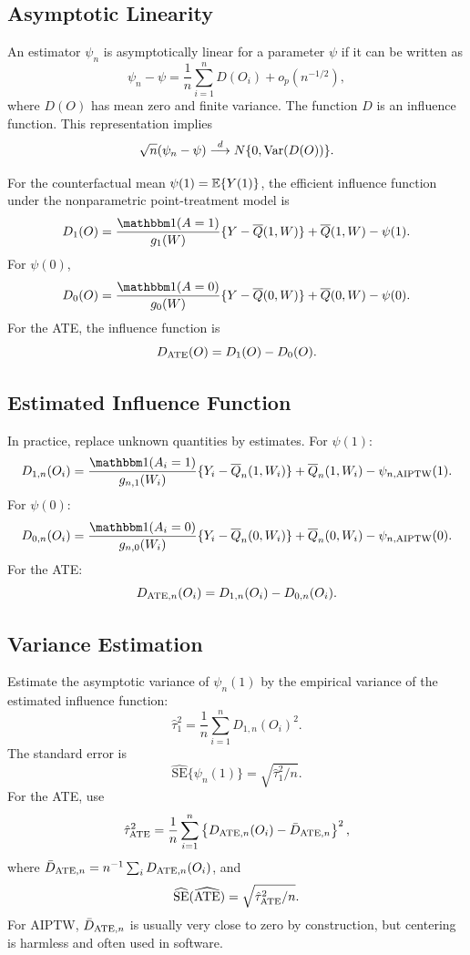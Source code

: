 \label{lec:7-5}

\subsection{Asymptotic Linearity}

An estimator $\psi_n$ is asymptotically linear for a parameter $\psi$ if it can be
written as
\[
\psi_n-\psi
=
\frac{1}{n}\sum_{i=1}^n D(O_i)+o_p(n^{-1/2}),
\]
where $D(O)$ has mean zero and finite variance. The function $D$ is an influence
function. This representation implies
\[
\sqrt n(\psi_n-\psi)\overset{d}{\longrightarrow}
N\{0,\operatorname{Var}(D(O))\}.
\]

For the counterfactual mean $\psi(1)=\mathbb{E}\{Y(1)\}$, the efficient influence function
under the nonparametric point-treatment model is
\[
D_1(O)
=
\frac{\ind(A=1)}{g_1(W)}
\{Y-\Qbar(1,W)\}
+
\Qbar(1,W)-\psi(1).
\]
For $\psi(0)$,
\[
D_0(O)
=
\frac{\ind(A=0)}{g_0(W)}
\{Y-\Qbar(0,W)\}
+
\Qbar(0,W)-\psi(0).
\]
For the ATE, the influence function is
\[
D_{\operatorname{ATE}}(O)=D_1(O)-D_0(O).
\]

\subsection{Estimated Influence Function}

In practice, replace unknown quantities by estimates. For $\psi(1)$:
\[
D_{1,n}(O_i)
=
\frac{\ind(A_i=1)}{g_{n,1}(W_i)}
\{Y_i-\Qbar_n(1,W_i)\}
+
\Qbar_n(1,W_i)-\psi_{n,\AIPTW}(1).
\]
For $\psi(0)$:
\[
D_{0,n}(O_i)
=
\frac{\ind(A_i=0)}{g_{n,0}(W_i)}
\{Y_i-\Qbar_n(0,W_i)\}
+
\Qbar_n(0,W_i)-\psi_{n,\AIPTW}(0).
\]
For the ATE:
\[
D_{\operatorname{ATE},n}(O_i)=D_{1,n}(O_i)-D_{0,n}(O_i).
\]

\subsection{Variance Estimation}

Estimate the asymptotic variance of $\psi_n(1)$ by the empirical variance of the
estimated influence function:
\[
\hat\tau_1^2
=
\frac{1}{n}\sum_{i=1}^n D_{1,n}(O_i)^2.
\]
The standard error is
\[
\widehat{\mathrm{SE}}\{\psi_n(1)\}
=
\sqrt{\hat\tau_1^2/n}.
\]
For the ATE, use
\[
\hat\tau_{\operatorname{ATE}}^2
=
\frac{1}{n}\sum_{i=1}^n
\left\{
D_{\operatorname{ATE},n}(O_i)-\bar D_{\operatorname{ATE},n}
\right\}^2,
\]
where $\bar D_{\operatorname{ATE},n}=n^{-1}\sum_iD_{\operatorname{ATE},n}(O_i)$, and
\[
\widehat{\mathrm{SE}}(\widehat{\operatorname{ATE}})
=
\sqrt{\hat\tau_{\operatorname{ATE}}^2/n}.
\]
For AIPTW, $\bar D_{\operatorname{ATE},n}$ is usually very close to zero by construction, but
centering is harmless and often used in software.

